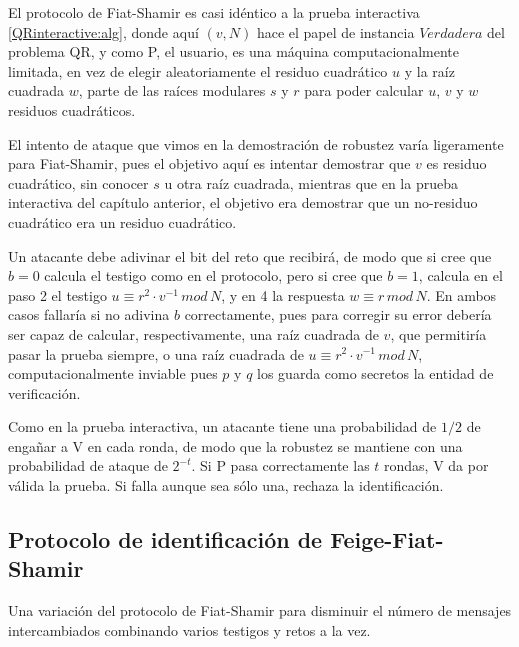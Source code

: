 \hfil


El protocolo de Fiat-Shamir es casi idéntico a la prueba interactiva \ref{QRinteractive:alg}, donde aquí $(v,N)$ hace el papel de instancia $Verdadera$ del problema QR, y como P, el usuario, es una máquina computacionalmente limitada, en vez de elegir aleatoriamente el residuo cuadrático $u$ y la raíz cuadrada $w$, parte de las raíces modulares $s$ y $r$ para poder calcular $u$, $v$ y $w$ residuos cuadráticos.


El intento de ataque que vimos en la demostración de robustez varía ligeramente para Fiat-Shamir, pues el objetivo aquí es intentar demostrar que $v$ es residuo cuadrático, sin conocer $s$ u otra raíz cuadrada, mientras que en la prueba interactiva del capítulo anterior, el objetivo era demostrar que un no-residuo cuadrático era un residuo cuadrático.

Un atacante debe adivinar el bit del reto que recibirá, de modo que si cree que $b=0$ calcula el testigo como en el protocolo, pero si cree que $b=1$, calcula en el paso 2 el testigo $u \equiv r^2\cdot v^{-1} \, mod \, N$, y en 4 la respuesta $w \equiv r \, mod \, N$. En ambos casos fallaría si no adivina $b$ correctamente, pues para corregir su error debería ser capaz de calcular, respectivamente, una raíz cuadrada de $v$, que permitiría pasar la prueba siempre, o una raíz cuadrada de $u \equiv r^2\cdot v^{-1} \, mod \, N$, computacionalmente inviable pues $p$ y $q$ los guarda como secretos la entidad de verificación.

Como en la prueba interactiva, un atacante tiene una probabilidad de $1/2$ de engañar a V en cada ronda, de modo que la robustez se mantiene con una probabilidad de ataque de $2^{-t}$. Si P pasa correctamente las $t$ rondas, V da por válida la prueba. Si falla aunque sea sólo una, rechaza la identificación.




\subsection{Protocolo de identificación de Feige-Fiat-Shamir}


Una variación del protocolo de Fiat-Shamir para disminuir el número de mensajes intercambiados combinando varios testigos y retos a la vez.

